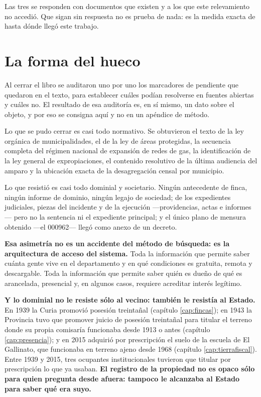 Las tres se responden con documentos que existen y a los que este relevamiento no accedió. Que sigan sin respuesta no es prueba de nada: es la medida exacta de hasta dónde llegó este trabajo.

\section{La forma del hueco}

Al cerrar el libro se auditaron uno por uno los marcadores de pendiente que quedaron en el texto, para establecer cuáles podían resolverse en fuentes abiertas y cuáles no. El resultado de esa auditoría es, en sí mismo, un dato sobre el objeto, y por eso se consigna aquí y no en un apéndice de método.

Lo que se pudo cerrar es casi todo normativo. Se obtuvieron el texto de la ley orgánica de municipalidades, el de la ley de áreas protegidas, la secuencia completa del régimen nacional de expansión de redes de gas, la identificación de la ley general de expropiaciones, el contenido resolutivo de la última audiencia del amparo y la ubicación exacta de la desagregación censal por municipio.

Lo que resistió es casi todo dominial y societario. Ningún antecedente de finca, ningún informe de dominio, ningún legajo de sociedad; de los expedientes judiciales, piezas del incidente y de la ejecución ---providencias, actas e informes--- pero no la sentencia ni el expediente principal; y el único plano de mensura obtenido ---el 000962--- llegó como anexo de un decreto.

\textbf{Esa asimetría no es un accidente del método de búsqueda: es la arquitectura de acceso del sistema.} Toda la información que permite saber cuánta gente vive en el departamento y en qué condiciones es gratuita, remota y descargable. Toda la información que permite saber quién es dueño de qué es arancelada, presencial y, en algunos casos, requiere acreditar interés legítimo.

\textbf{Y lo dominial no le resiste sólo al vecino: también le resistía al Estado.} En 1939 la Curia promovió posesión treintañal (capítulo \ref{cap:fincas}); en 1943 la Provincia tuvo que promover juicio de posesión treintañal para titular el terreno donde su propia comisaría funcionaba desde 1913 o antes (capítulo \ref{cap:presencia}); y en 2015 adquirió por prescripción el suelo de la escuela de El Gallinato, que funcionaba en terreno ajeno desde 1968 (capítulo \ref{cap:tierrafiscal}). Entre 1939 y 2015, tres ocupantes institucionales tuvieron que titular por prescripción lo que ya usaban. \textbf{El registro de la propiedad no es opaco sólo para quien pregunta desde afuera: tampoco le alcanzaba al Estado para saber qué era suyo.}

